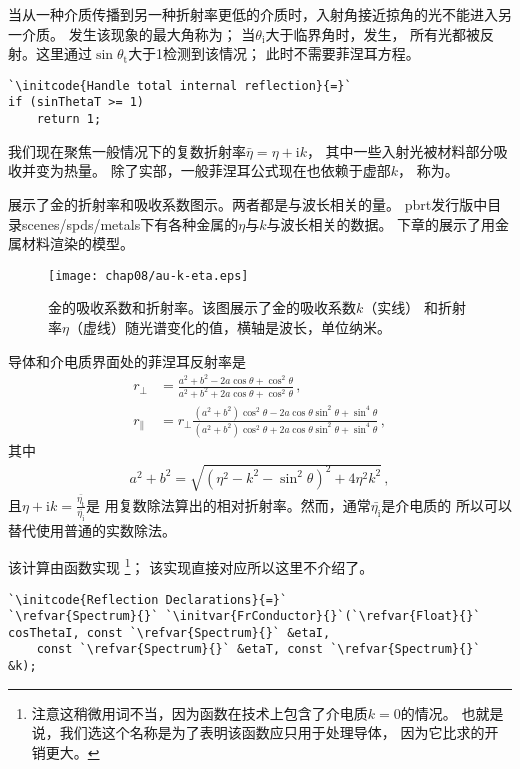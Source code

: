 当从一种介质传播到另一种折射率更低的介质时，入射角接近掠角的光不能进入另一介质。
发生该现象的最大角称为；
当$\theta_{\mathrm{i}}$大于临界角时，发生，
所有光都被反射。这里通过$\sin\theta_{\mathrm{t}}$大于1检测到该情况；
此时不需要菲涅耳方程。
\begin{lstlisting}
`\initcode{Handle total internal reflection}{=}`
if (sinThetaT >= 1)
    return 1;
\end{lstlisting}

我们现在聚焦一般情况下的复数折射率$\bar{\eta}=\eta+\mathrm{i}k$，
其中一些入射光被材料部分吸收并变为热量。
除了实部，一般菲涅耳公式现在也依赖于虚部$k$，
称为。

展示了金的折射率和吸收系数图示。两者都是与波长相关的量。
pbrt发行版中目录{\ttfamily scenes/spds/metals}下有各种金属的$\eta$与$k$与波长相关的数据。
下章的展示了用金属材料渲染的模型。
\begin{figure}[htbp]
    \centering
    \texttt{[image: chap08/au-k-eta.eps]}
    \caption{金的吸收系数和折射率。该图展示了金的吸收系数$k$（实线）
        和折射率$\eta$（虚线）随光谱变化的值，横轴是波长，单位纳米。}
    \label{fig:8.6}
\end{figure}

导体和介电质界面处的菲涅耳反射率是
\begin{align}
    \label{eq:8.3}
    r_{\perp}     & =\frac{a^2+b^2-2a\cos\theta+\cos^2\theta}{a^2+b^2+2a\cos\theta+\cos^2\theta}\, ,\nonumber                                                     \\
    r_{\parallel} & =r_{\perp}\frac{(a^2+b^2)\cos^2\theta-2a\cos\theta\sin^2\theta+\sin^4\theta}{(a^2+b^2)\cos^2\theta+2a\cos\theta\sin^2\theta+\sin^4\theta}\, ,
\end{align}
其中
\begin{align*}
    a^2+b^2=\sqrt{(\eta^2-k^2-\sin^2\theta)^2+4\eta^2k^2}\, ,
\end{align*}
且$\displaystyle\eta+\mathrm{i}k=\frac{\bar{\eta_\mathrm{t}}}{\bar{\eta_\mathrm{i}}}$是
用复数除法算出的相对折射率。然而，通常$\bar{\eta_\mathrm{i}}$是介电质的
所以可以替代使用普通的实数除法。

该计算由函数实现
\footnote{注意这稍微用词不当，因为函数在技术上包含了介电质$k=0$的情况。
    也就是说，我们选这个名称是为了表明该函数应只用于处理导体，
    因为它比求的开销更大。}；
该实现直接对应所以这里不介绍了。
\begin{lstlisting}
`\initcode{Reflection Declarations}{=}`
`\refvar{Spectrum}{}` `\initvar{FrConductor}{}`(`\refvar{Float}{}` cosThetaI, const `\refvar{Spectrum}{}` &etaI,
    const `\refvar{Spectrum}{}` &etaT, const `\refvar{Spectrum}{}` &k);
\end{lstlisting}

